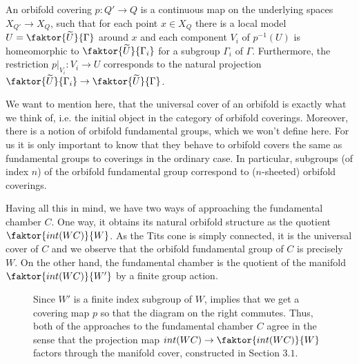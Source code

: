 \begin{definition}
    An orbifold covering \(p: Q' \to Q\) is a continuous map on the underlying spaces \(X_{Q'} \to X_Q\), such that for each point \(x \in X_Q\) there is a local model \(U = \faktor{\widetilde{U}}{\Gamma}\) around \(x\) and each component \(V_i\) of \(p^{-1}(U)\) is homeomorphic to \(\faktor{\widetilde{U}}{\Gamma_i}\) for a subgroup \(\Gamma_i\) of \(\Gamma\).
    Furthermore, the restriction \(p\vert_{V_i} : V_i \to U\) corresponds to the natural projection \(\faktor{\widetilde{U}}{\Gamma_i} \to \faktor{\widetilde{U}}{\Gamma}\).
\end{definition}

\begin{remark}\label{rmk:covers}
    We want to mention here, that the universal cover of an orbifold is exactly what we think of, i.e. the initial object in the category of orbifold coverings.
    Moreover, there is a notion of orbifold fundamental groups, which we won't define here.
    For us it is only important to know that they behave to orbifold covers the same as fundamental groups to coverings in the ordinary case.
    In particular, subgroups (of index \(n\)) of the orbifold fundamental group correspond to (\(n\)-sheeted) orbifold coverings.
\end{remark}
    
Having all this in mind, we have two ways of approaching the fundamental chamber \(C\).
One way, it obtains its natural orbifold structure as the quotient \(\faktor{int(WC)}{W}\).
As the Tits cone is simply connected, it is the universal cover of \(C\) and we observe that the orbifold fundamental group of \(C\) is precisely \(W\).
On the other hand, the fundamental chamber is the quotient of the manifold \(\faktor{int(WC)}{W'}\) by a finite group action.
\vspace*{\parskip}

\begin{figure}[h!]
    \begin{minipage}[c]{.6\textwidth}
        Since \(W'\) is a finite index subgroup of \(W\),  implies that we get a covering map \(p\) so that the diagram on the right commutes.
        Thus, both of the approaches to the fundamental chamber \(C\) agree in the sense that the projection map \(int(WC) \to \faktor{int(WC)}{W}\) factors through the manifold cover, constructed in Section \(3.1\).
    \end{minipage}\quad
    \begin{minipage}{.35\textwidth}\vspace*{-1em}
    \end{minipage}
\end{figure}


